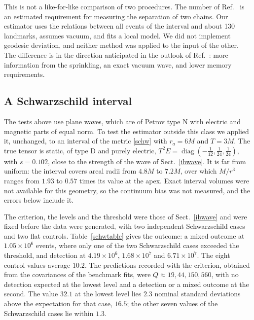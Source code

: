\documentclass[11pt,a4paper]{article}
\begin{document}
This is not a like-for-like comparison of two procedures. The number of
Ref.~\cite{ib} is an estimated requirement for measuring the separation of
two chains. Our estimator uses the relations between all events of the
interval and about 130 landmarks, assumes vacuum, and fits a local model.
We did not implement geodesic deviation, and neither method was applied to
the input of the other. The difference is in the direction anticipated in
the outlook of Ref.~\cite{ib}: more information from the sprinkling, an
exact vacuum wave, and lower memory requirements.

\subsection{A Schwarzschild interval}\label{schwres}
The tests above use plane waves, which are of Petrov type N with electric
and magnetic parts of equal norm. To test the estimator outside this class
we applied it, unchanged, to an interval of the metric \eqref{schw} with
$r_a=6M$ and $T=3M$. The true tensor is static, of type D and purely
electric, $T^2E=\operatorname{diag}(-\tfrac1{12},\tfrac1{24},\tfrac1{24})$,
with $s=0.102$, close to the strength of the wave of Sect.~\ref{ibwave}. It
is far from uniform: the interval covers areal radii from $4.8M$ to $7.2M$,
over which $M/r^3$ ranges from $1.93$ to $0.57$ times its value at the apex.
Exact interval volumes were not available for this geometry, so the
continuum bias was not measured, and the errors below include it.

The criterion, the levels and the threshold were those of
Sect.~\ref{ibwave} and were fixed before the data were generated, with two
independent Schwarzschild cases and two flat controls.
Table~\ref{schwtable} gives the outcome: a mixed outcome at $1.05\times10^6$ events, where only one of the two
Schwarzschild cases exceeded the threshold, and detection at
$4.19\times10^6$, $1.68\times10^7$ and $6.71\times10^7$. The eight control
values average $10.2$. The
predictions recorded with the criterion, obtained from the covariances of
the benchmark fits, were $Q\approx19,44,150,560$, with no detection
expected at the lowest level and a detection or a mixed outcome at the
second. The value $32.1$ at the lowest level lies $2.3$ nominal standard
deviations above the expectation for that case, $16.5$; the other seven
values of the Schwarzschild cases lie within $1.3$.
\end{document}
